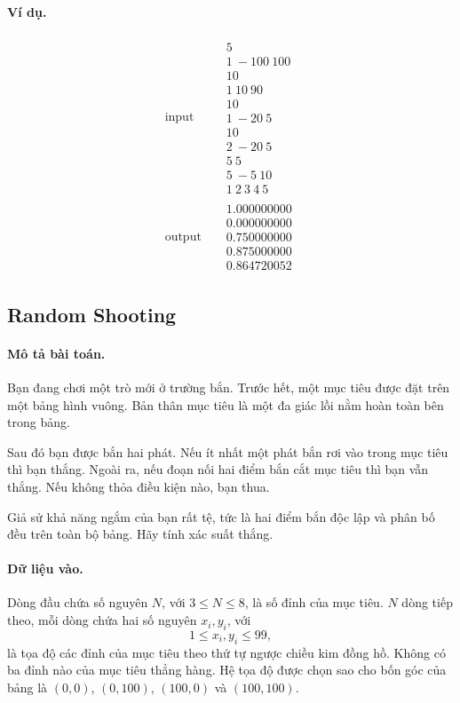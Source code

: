 \documentclass[11pt]{article}
\begin{document}
\paragraph{Ví dụ.}
\[
\begin{array}{rcl}
\text{input} &&
\begin{array}{l}
5\\
1\ -100\ 100\\
10\\
1\ 10\ 90\\
10\\
1\ -20\ 5\\
10\\
2\ -20\ 5\\
5\ 5\\
5\ -5\ 10\\
1\ 2\ 3\ 4\ 5
\end{array}
\\[1em]
\text{output} &&
\begin{array}{l}
1.000000000\\
0.000000000\\
0.750000000\\
0.875000000\\
0.864720052
\end{array}
\end{array}
\]

\subsection*{Random Shooting}

\paragraph{Mô tả bài toán.}
Bạn đang chơi một trò mới ở trường bắn. Trước hết, một mục tiêu được đặt trên
một bảng hình vuông. Bản thân mục tiêu là một đa giác lồi nằm hoàn toàn bên
trong bảng.

Sau đó bạn được bắn hai phát. Nếu ít nhất một phát bắn rơi vào trong mục tiêu
thì bạn thắng. Ngoài ra, nếu đoạn nối hai điểm bắn cắt mục tiêu thì bạn vẫn
thắng. Nếu không thỏa điều kiện nào, bạn thua.

Giả sử khả năng ngắm của bạn rất tệ, tức là hai điểm bắn độc lập và phân bố
đều trên toàn bộ bảng. Hãy tính xác suất thắng.

\paragraph{Dữ liệu vào.}
Dòng đầu chứa số nguyên \(N\), với \(3\le N\le 8\), là số đỉnh của mục tiêu.
\(N\) dòng tiếp theo, mỗi dòng chứa hai số nguyên \(x_i,y_i\), với
\[
  1\le x_i,y_i\le 99,
\]
là tọa độ các đỉnh của mục tiêu theo thứ tự ngược chiều kim đồng hồ. Không có
ba đỉnh nào của mục tiêu thẳng hàng. Hệ tọa độ được chọn sao cho bốn góc của
bảng là \((0,0)\), \((0,100)\), \((100,0)\) và \((100,100)\).
\end{document}
